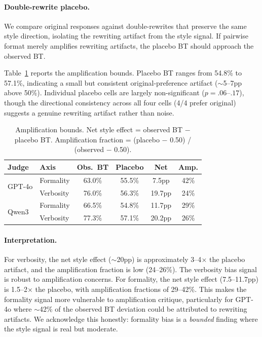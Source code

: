 \documentclass[11pt]{article}
\begin{document}
\paragraph{Double-rewrite placebo.}
We compare original responses against double-rewrites that preserve the same style direction, isolating the rewriting artifact from the style signal.
If pairwise format merely amplifies rewriting artifacts, the placebo BT should approach the observed BT.

Table~\ref{tab:amplification} reports the amplification bounds.
Placebo BT ranges from 54.8\% to 57.1\%, indicating a small but consistent original-preference artifact (${\sim}$5--7pp above 50\%).
Individual placebo cells are largely non-significant ($p = .06$--$.17$), though the directional consistency across all four cells (4/4 prefer original) suggests a genuine rewriting artifact rather than noise.

\begin{table}[t]
\centering
\small
\caption{Amplification bounds. Net style effect = observed BT $-$ placebo BT. Amplification fraction = (placebo $-$ 0.50) / (observed $-$ 0.50).}
\label{tab:amplification}
\begin{tabular}{ll cccc}
\toprule
\textbf{Judge} & \textbf{Axis} & \textbf{Obs.\ BT} & \textbf{Placebo} & \textbf{Net} & \textbf{Amp.} \\
\midrule
\multirow{2}{*}{GPT-4o}
 & Formality & 63.0\% & 55.5\% & 7.5pp  & 42\% \\
 & Verbosity & 76.0\% & 56.3\% & 19.7pp & 24\% \\
\midrule
\multirow{2}{*}{Qwen3}
 & Formality & 66.5\% & 54.8\% & 11.7pp & 29\% \\
 & Verbosity & 77.3\% & 57.1\% & 20.2pp & 26\% \\
\bottomrule
\end{tabular}
\end{table}

\paragraph{Interpretation.}
For verbosity, the net style effect (${\sim}$20pp) is approximately 3--4$\times$ the placebo artifact, and the amplification fraction is low (24--26\%).
The verbosity bias signal is robust to amplification concerns.
For formality, the net style effect (7.5--11.7pp) is 1.5--2$\times$ the placebo, with amplification fractions of 29--42\%.
This makes the formality signal more vulnerable to amplification critique, particularly for GPT-4o where ${\sim}$42\% of the observed BT deviation could be attributed to rewriting artifacts.
We acknowledge this honestly: formality bias is a \emph{bounded} finding where the style signal is real but moderate.
\end{document}
